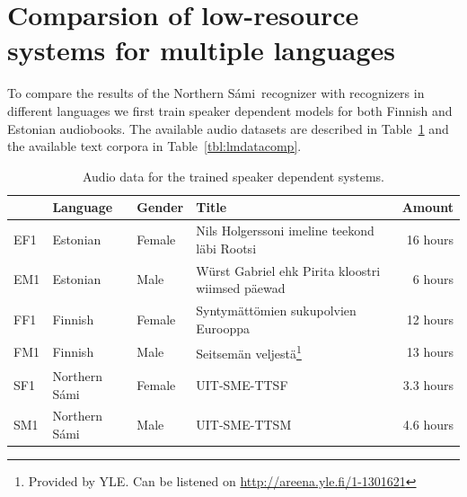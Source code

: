 \documentclass[b5paper]{article}
\newcommand{\ns}{Northern Sámi}
\begin{document}
%
%
%

\section{Comparsion of low-resource systems for multiple languages}
\label{sec:compexp}
To compare the results of the \ns\ recognizer with recognizers in different languages we first train speaker dependent models for both Finnish and Estonian audiobooks. The available audio datasets are described in Table~\ref{tbl:amdatacomp} and the available text corpora in Table~\ref{tbl:lmdatacomp}.


\begin{table}[!h]
\centering
\begin{tabular}{llllr}
 & \textbf{Language} & \textbf{Gender} & \textbf{Title} & \textbf{Amount}\\\hline
EF1 & Estonian & Female &Nils Holgerssoni imeline teekond läbi Rootsi  & 16 hours \\
EM1 & Estonian & Male & Würst Gabriel ehk Pirita kloostri wiimsed päewad & 6 hours \\
FF1 & Finnish & Female & Syntymättömien sukupolvien Eurooppa & 12 hours\\
FM1 & Finnish & Male & Seitsemän veljestä\footnote{Provided by YLE. Can be listened on  \url{http://areena.yle.fi/1-1301621}} & 13 hours\\
SF1 & \ns & Female & UIT-SME-TTSF & 3.3 hours  \\
SM1 & \ns & Male & UIT-SME-TTSM & 4.6 hours \\
\end{tabular}
\caption{Audio data for the trained speaker dependent systems.\label{tbl:amdatacomp}}
\end{table}
\end{document}
